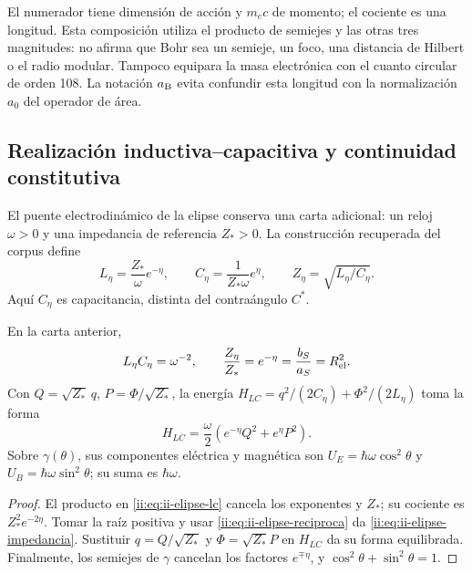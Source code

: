 El numerador tiene dimensión de acción y \(m_ec\) de momento; el
cociente es una longitud. Esta composición utiliza el producto de
semiejes y las otras tres magnitudes: no afirma que Bohr sea un semieje,
un foco, una distancia de Hilbert o el radio modular. Tampoco equipara
la masa electrónica con el cuanto circular de orden 108. La notación
\(a_{\rm B}\) evita confundir esta longitud con la normalización
\(a_0\) del operador de área.

\subsection{Realización inductiva--capacitiva y continuidad constitutiva}
\label{ii:sec:ii-elipse-lc}

El puente electrodinámico de la elipse conserva una carta adicional:
un reloj \(\omega>0\) y una impedancia de referencia \(Z_*>0\).
La construcción recuperada del corpus define
\begin{equation}
 L_\eta=\frac{Z_*}{\omega}e^{-\eta},\qquad
 C_\eta=\frac{1}{Z_*\omega}e^\eta,
 \qquad Z_\eta=\sqrt{L_\eta/C_\eta}.
 \label{ii:eq:ii-elipse-lc}
\end{equation}
Aquí \(C_\eta\) es capacitancia, distinta del contraángulo \(C^*\).
\begin{proposition}
\label{ii:prop:ii-elipse-lc}
En la carta anterior,
\begin{equation}
 L_\eta C_\eta=\omega^{-2},\qquad
 \frac{Z_\eta}{Z_*}=e^{-\eta}
 =\frac{b_S}{a_S}=R_{\rm el}^{2}.
 \label{ii:eq:ii-elipse-impedancia}
\end{equation}
Con \(Q=\sqrt{Z_*}\,q\), \(P=\Phi/\sqrt{Z_*}\), la energía
\(H_{LC}=q^2/(2C_\eta)+\Phi^2/(2L_\eta)\) toma la forma
\[
 H_{LC}=\frac\omega2(e^{-\eta}Q^2+e^\eta P^2).
\]
Sobre \(\gamma(\theta)\), sus componentes eléctrica y magnética son
\(U_E=\hbar\omega\cos^2\theta\) y
\(U_B=\hbar\omega\sin^2\theta\); su suma es \(\hbar\omega\).
\end{proposition}
\begin{proof}
El producto en \eqref{ii:eq:ii-elipse-lc} cancela los exponentes y
\(Z_*\); su cociente es \(Z_*^2e^{-2\eta}\). Tomar la raíz
positiva y usar \eqref{ii:eq:ii-elipse-reciproca} da
\eqref{ii:eq:ii-elipse-impedancia}. Sustituir \(q=Q/\sqrt{Z_*}\)
y \(\Phi=\sqrt{Z_*}P\) en \(H_{LC}\) da su forma equilibrada.
Finalmente, los semiejes de \(\gamma\) cancelan los factores
\(e^{\mp\eta}\), y \(\cos^2\theta+\sin^2\theta=1\).
\end{proof}

